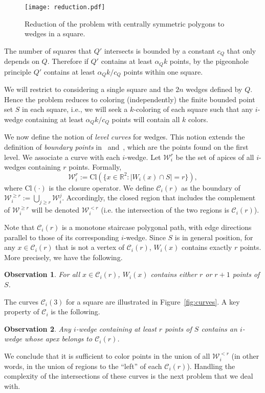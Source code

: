\documentclass[english,11pt]{article}
\newtheorem{observation}{Observation}
\newcommand{\R}{\mathbb R}
\newcommand{\bigc}{\mathcal C}
\newcommand{\bigw}{\mathcal W}
\newcommand{\closure}{\mathrm{Cl}}
\begin{document}
\begin{figure}[htb]
\begin{center}
\texttt{[image: reduction.pdf]}
\end{center}
\caption{\label{fig:reduc} Reduction of the problem with centrally symmetric polygons to wedges in a square.}
\end{figure}

The number of squares that $Q'$ intersects is bounded by
a constant $c_Q$ that only depends on $Q$. Therefore if $Q'$ contains at least $\alpha_Q k$ points,  by the
pigeonhole principle $Q'$ contains at least $\alpha_Q k/c_Q$ points within one square. 


We will restrict to considering a single square and
the $2n$ wedges defined by $Q$. Hence the problem reduces to coloring (independently) the finite bounded point set $S$ in each square, i.e., we will seek a $k$-coloring of each square such that any $i$-wedge
containing at least $\alpha_Q k /c_Q$ points will contain all $k$ colors.\medskip

We now define the notion of \emph{level curves} for wedges. This notion extends the 
definition of {\em boundary points} in~\cite{PT07} and~\cite{Pach86}, which are the points found on the first level.
We associate a curve with each $i$-wedge. 
Let $\bigw_i^{r}$ be the set of apices of all $i$-wedges containing $r$ points. Formally,
$$
\bigw_i^{r} := \closure\left(\{x\in \R^2: |W_i(x)\cap S| = r\}\right) ,
$$
\noindent where $\closure(\cdot)$ is the closure operator. We define $\bigc_i(r)$ as the boundary of $\bigw_i^{\geq r}:=\bigcup_{j\ge r}\bigw_i^{j}$.   Accordingly, the closed region that includes the complement of  $\bigw_i^{\geq r}$ will be denoted $\bigw_i^{< r}$ (i.e. the intersection of the two regions is $\bigc_i(r)$).\medskip

Note that $\bigc_i (r)$ is a monotone staircase polygonal path, with edge directions
parallel to those of its corresponding $i$-wedge. Since $S$ is in general
position,  for any $x\in \bigc_i(r)$ that is not a vertex of $\bigc_i(r)$,
$W_i(x)$ contains exactly $r$ points. More precisely, we have the following.
\begin{observation}
\label{obs:rorrp1}
For all $x\in \bigc_i(r)$, $W_i(x)$ contains either $r$ or $r{+}1$ points of $S$.
\end{observation}
\noindent The curves $\bigc_i(3)$ for a square are illustrated in Figure~\ref{fig:curves}. A key property of $\bigc_i$ is the following.
\begin{observation}
Any $i$-wedge containing at least $r$ points of $S$ contains an $i$-wedge whose apex belongs to $\bigc_i (r)$.
\end{observation}
We conclude that it is sufficient to color points in the union of 
all $\bigw_i^{< r}$ (in other words, in the union of regions to the ``left'' of each $\bigc_i(r)$).   Handling the complexity of the intersections of these curves is the next problem that we deal with.
\end{document}
